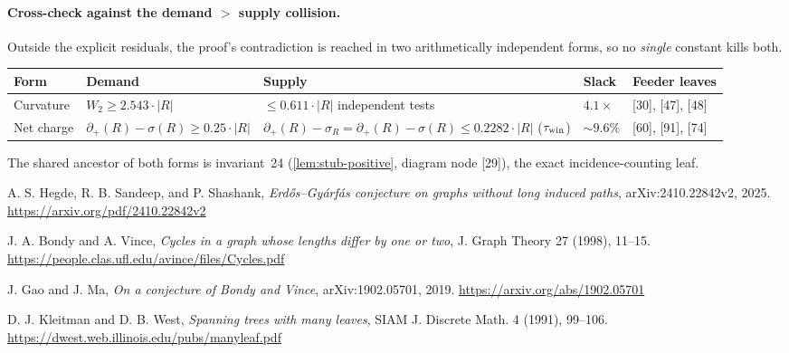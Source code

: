 \documentclass[11pt]{article}
\newcommand{\defp}{\partial_+}
\begin{document}
\paragraph{Cross-check against the demand $>$ supply collision.}
Outside the explicit residuals, the proof's contradiction is reached in two
arithmetically independent forms, so no \emph{single} constant kills both.

\begin{center}\small
\begin{tabular}{L{0.12\textwidth} L{0.23\textwidth} L{0.27\textwidth} L{0.07\textwidth} L{0.15\textwidth}}
\toprule
\textbf{Form} & \textbf{Demand} & \textbf{Supply} & \textbf{Slack} & \textbf{Feeder leaves} \\
\midrule
Curvature & $W_2\ge2.543\cdot|R|$ & $\le0.611\cdot|R|$ independent tests & $4.1\times$ & {[30]}, {[47]}, {[48]} \\
Net charge & $\defp(R)-\sigma(R)\ge0.25\cdot|R|$ & $\defp(R)-\sigma_R=\defp(R)-\sigma(R)\le0.2282\cdot|R|$ ($\tau_{\rm win}$) & $\sim9.6\%$ & {[60]}, {[91]}, {[74]} \\
\bottomrule
\end{tabular}
\end{center}
\noindent The shared ancestor of both forms is invariant~24 (\cref{lem:stub-positive}, diagram node {[29]}), the exact incidence-counting leaf.

\begin{thebibliography}{9}

A. S. Hegde, R. B. Sandeep, and P. Shashank,
\emph{Erd\H{o}s--Gy\'arf\'as conjecture on graphs without long induced paths},
arXiv:2410.22842v2, 2025.
\url{https://arxiv.org/pdf/2410.22842v2}

J. A. Bondy and A. Vince,
\emph{Cycles in a graph whose lengths differ by one or two},
J. Graph Theory 27 (1998), 11--15.
\url{https://people.clas.ufl.edu/avince/files/Cycles.pdf}

J. Gao and J. Ma,
\emph{On a conjecture of Bondy and Vince},
arXiv:1902.05701, 2019.
\url{https://arxiv.org/abs/1902.05701}

D. J. Kleitman and D. B. West,
\emph{Spanning trees with many leaves},
SIAM J. Discrete Math. 4 (1991), 99--106.
\url{https://dwest.web.illinois.edu/pubs/manyleaf.pdf}

\end{thebibliography}
\end{document}

